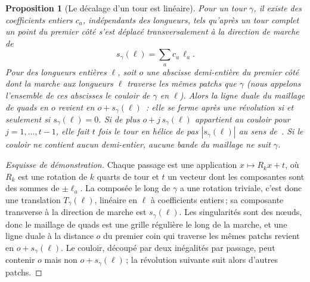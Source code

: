 \documentclass[11pt,a4paper]{article}
\newtheorem{proposition}{Proposition}
\newcommand{\shift}{s}
\newcommand{\lean}[1]{\texttt{\detokenize{#1}}}
\newenvironment{evidence}[3][]{}{}
\begin{document}
\begin{evidence}{core}{\lean{TMesh.Turn.shift_linear}, \lean{TMesh.Turn.mem_corridor_iff}, \lean{TMesh.Turn.comes_back}, \lean{TMesh.Turn.winds}, \lean{TMesh.Turn.development_eq} (dans le plan, $T_\gamma(\ell) = -\alpha_\gamma(\ell) e_1 + \shift_\gamma(\ell) e_2$ aux longueurs entières)\,; exemples~: \lean{TMesh.twistedTorus.walk_turn}\,; testé~: le développement contre l'holonomie du mot du tour sur 3\,865 tours de 34 sphères\,; supposé~: un recollement orienté\,; le corridor sans demi-entier n'est pas formalisé}
\begin{proposition}[Le décalage d'un tour est linéaire]\label{prop:linear}
Pour un tour $\gamma$, il existe des coefficients entiers $c_a$, indépendants
des longueurs, tels qu'après un tour complet un point du premier côté s'est
déplacé transversalement à la direction de marche de
\[
  \shift_\gamma(\ell) = \sum_a c_a\, \ell_a .
\]
Pour des longueurs entières $\ell$, soit $o$ une abscisse demi-entière du
premier côté dont la marche aux longueurs $\ell$ traverse les mêmes patchs que
$\gamma$ (nous appelons l'ensemble de ces abscisses le \emph{couloir} de
$\gamma$ en $\ell$). Alors la ligne duale du maillage de quads en $o$ revient
en $o + \shift_\gamma(\ell)$~: elle se ferme après une révolution si et
seulement si $\shift_\gamma(\ell) = 0$. Si de plus $o + j\,\shift_\gamma(\ell)$
appartient au couloir pour $j = 1, \dots, t - 1$, elle fait $t$ fois le tour
en hélice de pas $|\shift_\gamma(\ell)|$ au sens
de~\cite{bommes2011structure}. Si le couloir ne contient aucun demi-entier,
aucune bande du maillage ne suit $\gamma$.
\end{proposition}
\end{evidence}

\begin{proof}[Esquisse de démonstration]
Chaque passage est une application $x \mapsto R_k x + t$, où $R_k$ est une
rotation de $k$ quarts de tour et $t$ un vecteur dont les composantes sont des
sommes de $\pm\ell_a$. La composée le long de $\gamma$ a une rotation
triviale, c'est donc une translation $T_\gamma(\ell)$, linéaire en $\ell$ à
coefficients entiers\,; sa composante transverse à la direction de marche est
$\shift_\gamma(\ell)$. Les singularités sont des nœuds, donc le maillage de
quads est une grille régulière le long de la marche, et une ligne duale à la
distance $o$ du premier coin qui traverse les mêmes patchs revient en $o +
\shift_\gamma(\ell)$. Le couloir, découpé par deux inégalités par passage,
peut contenir $o$ mais non $o + \shift_\gamma(\ell)$\,; la révolution
suivante suit alors d'autres patchs.
\end{proof}
\end{document}

